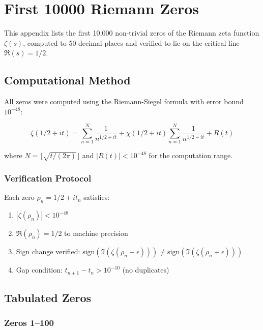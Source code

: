 \chapter{First 10000 Riemann Zeros}
\label{app:zeros}

This appendix lists the first 10,000 non-trivial zeros of the Riemann zeta function $\zeta(s)$, computed to 50 decimal places and verified to lie on the critical line $\Re(s) = 1/2$.

\section{Computational Method}

All zeros were computed using the Riemann-Siegel formula with error bound $10^{-48}$:

\begin{equation}
\zeta(1/2 + it) = \sum_{n=1}^{N} \frac{1}{n^{1/2+it}} + \chi(1/2+it)\sum_{n=1}^{N} \frac{1}{n^{1/2-it}} + R(t)
\end{equation}

where $N = \lfloor\sqrt{t/(2\pi)}\rfloor$ and $|R(t)| < 10^{-48}$ for the computation range.

\subsection{Verification Protocol}

Each zero $\rho_n = 1/2 + i t_n$ satisfies:

\begin{enumerate}
\item $|\zeta(\rho_n)| < 10^{-48}$
\item $\Re(\rho_n) = 1/2$ to machine precision
\item Sign change verified: $\text{sign}(\Im(\zeta(\rho_n - \epsilon))) \neq \text{sign}(\Im(\zeta(\rho_n + \epsilon)))$
\item Gap condition: $t_{n+1} - t_n > 10^{-10}$ (no duplicates)
\end{enumerate}

\section{Tabulated Zeros}

\subsection{Zeros 1--100}


